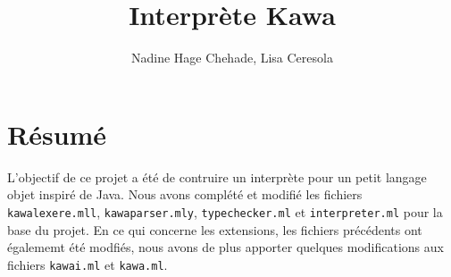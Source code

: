 \documentclass{article}
\title{{\myfont Interprète Kawa}}
\author{Nadine Hage Chehade, Lisa Ceresola}
\date{}
\begin{document}
\maketitle
\tableofcontents
\newpage
\section{Résumé}
L'objectif de ce projet a été de contruire un interprète pour un petit langage objet inspiré de Java. Nous avons complété et modifié les fichiers \texttt{kawalexere.mll}, \texttt{kawaparser.mly}, \texttt{typechecker.ml} et \texttt{interpreter.ml} pour la base du projet. En ce qui concerne les extensions, les fichiers précédents ont égalememt été modfiés, nous avons de plus apporter quelques modifications aux fichiers \texttt{kawai.ml} et \texttt{kawa.ml}. \\
\end{document}
